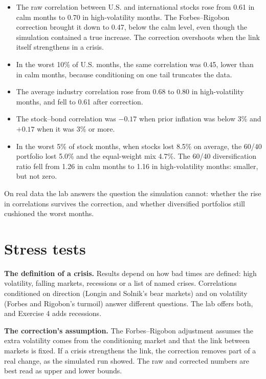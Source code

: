 \begin{itemize}
  \item The raw correlation between U.S. and international stocks rose from 0.61 in calm months to 0.70 in high-volatility months. The Forbes--Rigobon correction brought it down to 0.47, below the calm level, even though the simulation contained a true increase. The correction overshoots when the link itself strengthens in a crisis.
  \item In the worst 10\% of U.S. months, the same correlation was 0.45, lower than in calm months, because conditioning on one tail truncates the data.
  \item The average industry correlation rose from 0.68 to 0.80 in high-volatility months, and fell to 0.61 after correction.
  \item The stock--bond correlation was $-0.17$ when prior inflation was below 3\% and $+0.17$ when it was 3\% or more.
  \item In the worst 5\% of stock months, when stocks lost 8.5\% on average, the 60/40 portfolio lost 5.0\% and the equal-weight mix 4.7\%. The 60/40 diversification ratio fell from 1.26 in calm months to 1.16 in high-volatility months: smaller, but not zero.
\end{itemize}

On real data the lab answers the question the simulation cannot: whether the rise in correlations survives the correction, and whether diversified portfolios still cushioned the worst months.

\section{Stress tests}
\label{sec:20-stress}

\textbf{The definition of a crisis.} Results depend on how bad times are defined: high volatility, falling markets, recessions or a list of named crises. Correlations conditioned on direction (Longin and Solnik's bear markets) and on volatility (Forbes and Rigobon's turmoil) answer different questions. The lab offers both, and Exercise 4 adds recessions.

\textbf{The correction's assumption.} The Forbes--Rigobon adjustment assumes the extra volatility comes from the conditioning market and that the link between markets is fixed. If a crisis strengthens the link, the correction removes part of a real change, as the simulated run showed. The raw and corrected numbers are best read as upper and lower bounds.

